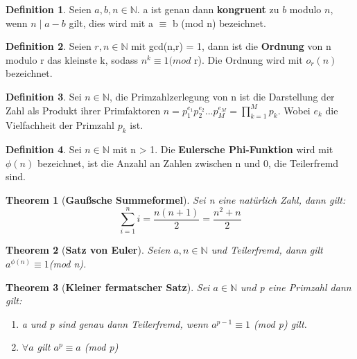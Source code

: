 \documentclass[12pt,oneside]{article}
\newtheorem{theorem}{Theorem}[section]
\theoremstyle{remark}
\theoremstyle{definition}
\newtheorem{definition}{Definition}[section]
\begin{document}
\smallskip 

\begin{definition}\label{Df_3}
Seien $a, b, n \in \mathbb{N}$. a ist genau dann \textbf{kongruent} zu $b$ modulo $n$, wenn $n \mid a - b $ gilt, dies wird mit a $\equiv$ b (mod n) bezeichnet.  
\end{definition}

\smallskip 

\begin{definition}\label{Df_4}
Seien $r,n \in \mathbb{N}$ mit gcd(n,r) = 1, dann ist die \textbf{Ordnung} von n modulo r das kleinste k, sodass $n^k \equiv 1 (mod $ r). Die Ordnung wird mit $o_{r}(n)$ bezeichnet.
\end{definition}

\smallskip


\begin{definition}\label{Df_5}
Sei $n \in \mathbb{N}$, die Primzahlzerlegung von n ist die Darstellung der Zahl als Produkt ihrer Primfaktoren \newline
$n = p_{1}^{e_{1}}p_{2}^{e_{2}}...p_{M}^{e_{M}} = \prod_{k=1}^{M} p_{k}$. Wobei $e_{k}$ die Vielfachheit der Primzahl $p_{k}$ ist.
\end{definition}

\smallskip

\begin{definition}\label{Df_6}
Sei $n \in \mathbb{N}$ mit n > 1. Die \textbf{Eulersche Phi-Funktion} wird mit $\phi(n)$ bezeichnet, ist die Anzahl an Zahlen zwischen n und 0, die Teilerfremd sind.
\end{definition}

\smallskip

\begin{theorem}[\textbf{Gaußsche Summeformel}]\label{gauss}
Sei n eine natürlich Zahl, dann gilt:
\begin{equation}
    \sum_{i = 1}^{n} i = \frac{n (n + 1)}{2} = \frac{n^2 + n}{2} 
\end{equation}
\end{theorem}

\smallskip
\begin{theorem}[\textbf{Satz von Euler}]\label{Th_1}
Seien $a,n \in \mathbb{N}$ und Teilerfremd, \newline dann gilt $a^{\phi(n)} \equiv 1 $(mod n).
\end{theorem}

\smallskip

\begin{theorem}[\textbf{Kleiner fermatscher Satz}]\label{Th_2}
Sei $a \in \mathbb{N}$ und p eine Primzahl dann gilt:\newline
\begin{enumerate}
    \item a und p sind genau dann Teilerfremd, wenn $a^{p-1} \equiv 1 $ (mod p) gilt.
    \newline
    \item $\forall a $ gilt  $a^p \equiv a$ (mod p)
\end{enumerate}
\end{theorem}
\end{document}
